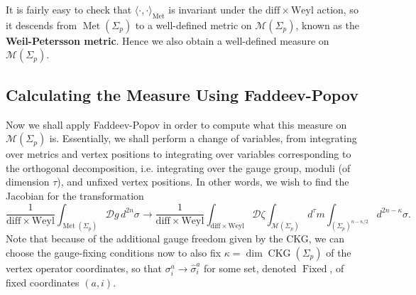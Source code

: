 \documentclass{report}
\theoremstyle{plain}
\theoremstyle{definition}
\theoremstyle{remark}
\newcommand{\cD}{\mathcal{D}}
\newcommand{\cM}{\mathcal{M}}
\newcommand{\diff}{\mathrm{diff}}
\newcommand{\Weyl}{\mathrm{Weyl}}
\DeclareMathOperator{\Met}{Met}
\DeclareMathOperator{\CKG}{CKG}
\DeclareMathOperator{\Fixed}{Fixed}
\begin{document}
It is fairly easy to check that $\langle \cdot, \cdot \rangle_{\Met}$
is invariant under the $\diff \times \Weyl$ action, so it descends
from $\Met(\Sigma_p)$ to a well-defined metric on $\cM(\Sigma_p)$,
known as the {\bf Weil-Petersson metric}. Hence we also obtain a
well-defined measure on $\cM(\Sigma_p)$.

\subsection{Calculating the Measure Using Faddeev-Popov}

Now we shall apply Faddeev-Popov in order to compute what this measure
on $\cM(\Sigma_p)$ is. Essentially, we shall perform a change of
variables, from integrating over metrics and vertex positions to
integrating over variables corresponding to the orthogonal
decomposition, i.e. integrating over the gauge group, moduli (of
dimension $\tau$), and unfixed vertex positions. In other words, we
wish to find the Jacobian for the transformation
\[ \frac{1}{\diff \times \Weyl}\int_{\Met(\Sigma_p)} \cD g \, d^{2n}\sigma \to \frac{1}{\diff \times \Weyl}\int_{\diff \times \Weyl} \cD \zeta \int_{\cM(\Sigma_p)} d^\tau m \int_{(\Sigma_p)^{n-\kappa/2}} d^{2n-\kappa}\sigma. \]
Note that because of the additional gauge freedom given by the CKG, we
can choose the gauge-fixing conditions now to also fix $\kappa = \dim
\CKG(\Sigma_p)$ of the vertex operator coordinates, so that
$\sigma_i^a \to \hat{\sigma}_i^a$ for some set, denoted $\Fixed$, of
fixed coordinates $(a, i)$.
\end{document}
